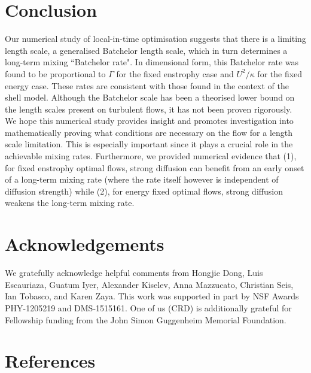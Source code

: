 \documentclass[12pt]{iopart}
\begin{document}


\section{Conclusion}
\label{sec:conclusion}


Our numerical study of local-in-time optimisation suggests that there is a limiting length scale, a generalised Batchelor length scale, which in turn determines a long-term mixing ``Batchelor rate". In dimensional form, this Batchelor rate was found to be proportional to $\Gamma$ for the fixed enstrophy case and $U^{2}/\kappa$ for the fixed energy case. These rates are consistent with those found in the context of the shell model. Although the Batchelor scale has been a theorised lower bound on the length scales present on turbulent flows, it has not been proven rigorously. We hope this numerical study provides insight and promotes investigation into mathematically proving what conditions are necessary on the flow for a length scale limitation. This is especially important since it plays a crucial role in the achievable mixing rates. Furthermore, we provided numerical evidence that (1), for fixed enstrophy optimal flows, strong diffusion can benefit from an early onset of a long-term mixing rate (where the rate itself however is independent of diffusion strength) while (2), for energy fixed optimal flows, strong diffusion weakens the long-term mixing rate. 


\section*{Acknowledgements}
We gratefully acknowledge helpful comments from Hongjie Dong, Luis Escauriaza, Guatum Iyer, Alexander Kiselev, Anna Mazzucato, Christian Seis, Ian Tobasco, and Karen Zaya. This work was supported in part by NSF Awards PHY-1205219 and DMS-1515161. One of us (CRD) is additionally grateful for Fellowship funding from the John Simon Guggenheim Memorial Foundation. 

 

\section*{References}


\end{document}
